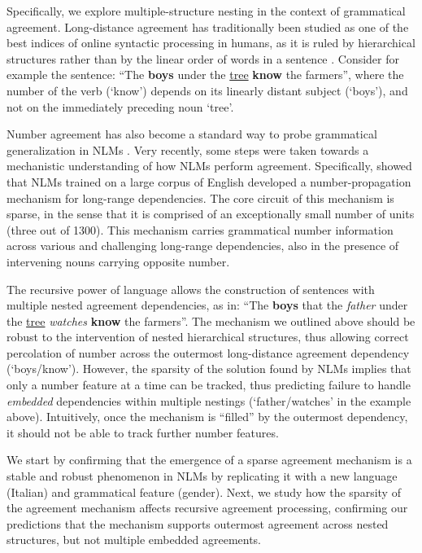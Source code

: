 Specifically, we explore multiple-structure nesting in the context of grammatical agreement. Long-distance agreement has traditionally been studied as one of the  best indices of online syntactic processing in humans, as it is ruled
by hierarchical structures rather than by the linear order of words in
a sentence \citep{Bock:Miller:1991, franck2002subject}. Consider for example the sentence: ``The \textbf{boys} under the \underline{tree} \textbf{know} the farmers'', where the number of the verb (`know') depends on its linearly distant subject (`boys'), and not on the immediately preceding noun `tree'.

Number agreement has also become a standard way to probe grammatical
generalization in NLMs \citep{Linzen:etal:2016,Bernardy:Lappin:2017,Giulianelli:etal:2018,Gulordava:etal:2018}. Very
recently, some steps were taken towards a mechanistic understanding of
how NLMs perform agreement. Specifically, \citet{lakretz2019emergence} showed that NLMs trained
on a large corpus of English developed a number-propagation mechanism for long-range dependencies. The core circuit of this mechanism is sparse, in the sense that it is comprised of an exceptionally small number of units (three out of 1300). This mechanism carries grammatical number information across various and challenging long-range dependencies, also in the presence of intervening nouns carrying opposite number.

The recursive power of language allows the construction of sentences with multiple nested agreement dependencies, as in: ``The \textbf{boys} that the \textit{father} under the \underline{tree} \textit{watches} \textbf{know} the farmers''. The mechanism we outlined above should be robust to the intervention of nested hierarchical structures, thus allowing correct percolation of number across the outermost long-distance agreement dependency (`boys/know'). However, the sparsity of the solution found by NLMs implies that only a number feature at a time can be tracked, thus predicting failure to handle \emph{embedded} dependencies within multiple nestings (`father/watches' in the example above). Intuitively, once the mechanism is ``filled'' by the outermost
dependency, it should not be able to track further number features.

We  start by confirming that the emergence of a sparse
agreement mechanism is a stable and robust phenomenon in NLMs by
replicating it with a new language (Italian) and grammatical feature
(gender). Next, we study how the sparsity of the agreement mechanism
affects recursive agreement processing, confirming our predictions
that the mechanism supports outermost agreement across nested
structures, but not multiple embedded agreements.

